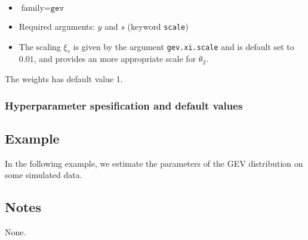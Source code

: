 \documentclass[a4paper,11pt]{article}
\begin{document}
\begin{itemize}
\item $\text{family}=\texttt{gev}$
\item Required arguments: $y$ and $s$ (keyword \texttt{scale})
\item The scaling $\xi_{s}$ is given by the argument
    \texttt{gev.xi.scale} and is default set to $0.01$, and provides
    an more appropriate scale for $\theta_{2}$.
\end{itemize}
The weights has default value 1.

\subsubsection*{Hyperparameter spesification and default values}


\subsection*{Example}

In the following example, we estimate the parameters of the GEV
distribution on some simulated data.


\subsection*{Notes}

None.
\end{document}

